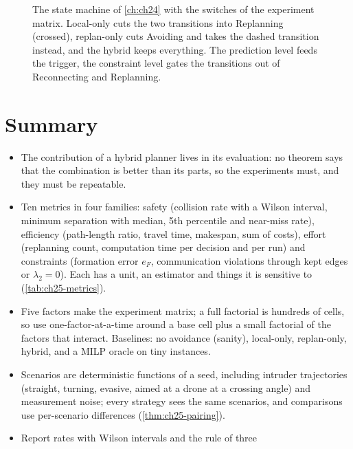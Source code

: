 \begin{figure}[tb]
  \centering
  \caption{The state machine of \cref{ch:ch24} with the switches of the
  experiment matrix. Local-only cuts the two transitions into Replanning
  (crossed), replan-only cuts Avoiding and takes the dashed transition
  instead, and the hybrid keeps everything. The prediction level feeds the
  trigger, the constraint level gates the transitions out of Reconnecting
  and Replanning.}
  \label{fig:ch25-switches}
\end{figure}

\section{Summary}
\begin{summary}
\begin{itemize}
  \item The contribution of a hybrid planner lives in its evaluation: no
        theorem says that the combination is better than its parts, so the
        experiments must, and they must be repeatable.
  \item Ten metrics in four families: safety (collision rate with a Wilson
        interval, minimum separation with median, 5th percentile and
        near-miss rate), efficiency (path-length ratio, travel time,
        makespan, sum of costs), effort (replanning count, computation time
        per decision and per run) and constraints (formation error $e_F$,
        communication violations through kept edges or $\lambda_2 = 0$).
        Each has a unit, an estimator and things it is sensitive to
        (\cref{tab:ch25-metrics}).
  \item Five factors make the experiment matrix; a full factorial is
        hundreds of cells, so use one-factor-at-a-time around a base cell
        plus a small factorial of the factors that interact. Baselines:
        no avoidance (sanity), local-only, replan-only, hybrid, and a MILP
        oracle on tiny instances.
  \item Scenarios are deterministic functions of a seed, including intruder
        trajectories (straight, turning, evasive, aimed at a drone at a
        crossing angle) and measurement noise; every strategy sees the same
        scenarios, and comparisons use per-scenario differences
        (\cref{thm:ch25-pairing}).
  \item Report rates with Wilson intervals and the rule of three

\end{itemize}
\end{summary}
